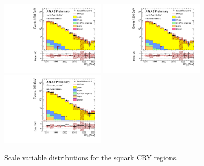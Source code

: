 \begin{figure}[tbph]
\begin{center}
\includegraphics[width=0.45\textwidth]{figures/ATLAS-CONF-2016-078_INT/N-1Plots/AtlasStyle/Preliminary/CRY_SRJigsawSRS2b_LastCut_CRY_minusone}
\includegraphics[width=0.45\textwidth]{figures/ATLAS-CONF-2016-078_INT/N-1Plots/AtlasStyle/Preliminary/CRY_SRJigsawSRS3a_LastCut_CRY_minusone}
\includegraphics[width=0.45\textwidth]{figures/ATLAS-CONF-2016-078_INT/N-1Plots/AtlasStyle/Preliminary/CRY_SRJigsawSRS3b_LastCut_CRY_minusone}
\end{center}
\caption{Scale variable distributions for the squark CRY regions.}
\label{fig:CRY_SRJigsawSRS1a_LastCut_CRY_minusone}
\end{figure}

